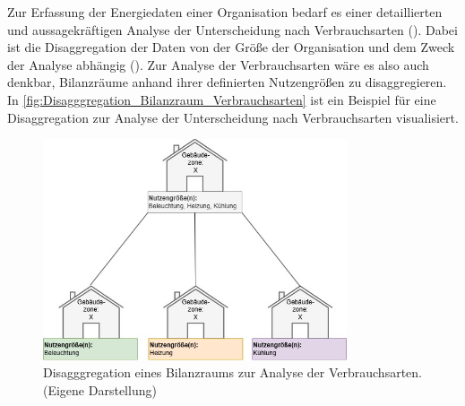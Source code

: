 Zur Erfassung der Energiedaten einer Organisation bedarf es einer detaillierten und aussagekräftigen Analyse der Unterscheidung nach Verbrauchsarten 
(\cite[S. 14]{Hohnhold.2013}). Dabei ist die Disaggregation der Daten von der Größe der Organisation und dem Zweck der Analyse abhängig (\cite[S. 14f.]{Hohnhold.2013}).
Zur Analyse der Verbrauchsarten wäre es also auch denkbar, Bilanzräume anhand ihrer definierten Nutzengrößen zu disaggregieren.
In \eqref{fig:Disagggregation_Bilanzraum_Verbrauchsarten} ist ein Beispiel für eine Disaggregation zur Analyse der Unterscheidung nach Verbrauchsarten visualisiert.




\begin{figure}[H]
    \centering
    \includegraphics[width=0.8\textwidth]{../../Ressourcen/Abbildungen/Nutzengröße_Bewertungseinheit_Zerlegt.jpg}
    \caption{Disagggregation eines Bilanzraums zur Analyse der Verbrauchsarten. (Eigene Darstellung)}
    \label{fig:Disagggregation_Bilanzraum_Verbrauchsarten}
\end{figure}